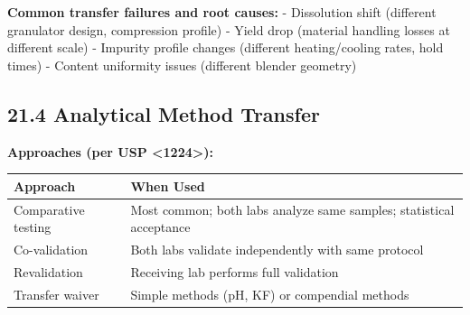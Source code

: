 \documentclass[
  11pt,
  a4paper,
]{report}
\begin{document}
\textbf{Common transfer failures and root causes:} - Dissolution shift
(different granulator design, compression profile) - Yield drop
(material handling losses at different scale) - Impurity profile changes
(different heating/cooling rates, hold times) - Content uniformity
issues (different blender geometry)

\hypertarget{analytical-method-transfer}{%
\subsection{21.4 Analytical Method
Transfer}\label{analytical-method-transfer}}

\textbf{Approaches (per USP \textless1224\textgreater):}

\begin{longtable}[]{@{}ll@{}}
\toprule
\begin{minipage}[b]{0.45\columnwidth}\raggedright
Approach\strut
\end{minipage} & \begin{minipage}[b]{0.49\columnwidth}\raggedright
When Used\strut
\end{minipage}\tabularnewline
\midrule
\endhead
\begin{minipage}[t]{0.45\columnwidth}\raggedright
Comparative testing\strut
\end{minipage} & \begin{minipage}[t]{0.49\columnwidth}\raggedright
Most common; both labs analyze same samples; statistical
acceptance\strut
\end{minipage}\tabularnewline
\begin{minipage}[t]{0.45\columnwidth}\raggedright
Co-validation\strut
\end{minipage} & \begin{minipage}[t]{0.49\columnwidth}\raggedright
Both labs validate independently with same protocol\strut
\end{minipage}\tabularnewline
\begin{minipage}[t]{0.45\columnwidth}\raggedright
Revalidation\strut
\end{minipage} & \begin{minipage}[t]{0.49\columnwidth}\raggedright
Receiving lab performs full validation\strut
\end{minipage}\tabularnewline
\begin{minipage}[t]{0.45\columnwidth}\raggedright
Transfer waiver\strut
\end{minipage} & \begin{minipage}[t]{0.49\columnwidth}\raggedright
Simple methods (pH, KF) or compendial methods\strut
\end{minipage}\tabularnewline
\bottomrule
\end{longtable}
\end{document}
